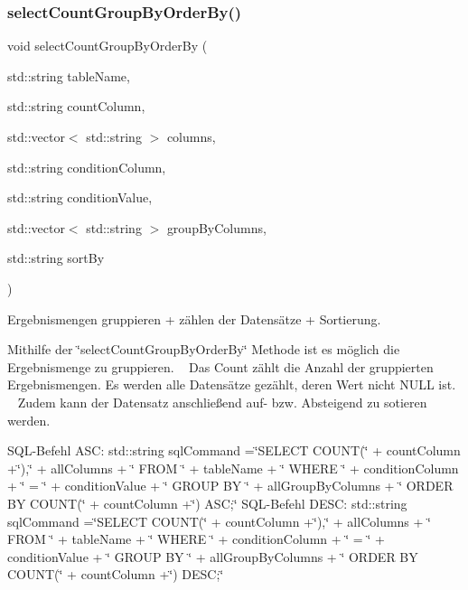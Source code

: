\subsubsection{select\+Count\+Group\+By\+Order\+By()}
{\footnotesize\ttfamily void select\+Count\+Group\+By\+Order\+By (\begin{DoxyParamCaption}\item[{std\+::string}]{table\+Name,  }\item[{std\+::string}]{count\+Column,  }\item[{std\+::vector$<$ std\+::string $>$}]{columns,  }\item[{std\+::string}]{condition\+Column,  }\item[{std\+::string}]{condition\+Value,  }\item[{std\+::vector$<$ std\+::string $>$}]{group\+By\+Columns,  }\item[{std\+::string}]{sort\+By }\end{DoxyParamCaption})}



Ergebnismengen gruppieren + zählen der Datensätze + Sortierung. 

Mithilfe der \char`\"{}select\+Count\+Group\+By\+Order\+By\char`\"{} Methode ist es möglich die Ergebnismenge zu gruppieren. ~\newline
 Das Count zählt die Anzahl der gruppierten Ergebnismengen. Es werden alle Datensätze gezählt, deren Wert nicht N\+U\+LL ist. ~\newline
 Zudem kann der Datensatz anschließend auf-\/ bzw. Absteigend zu sotieren werden. ~\newline


S\+Q\+L-\/\+Befehl A\+SC\+: std\+::string sql\+Command =\char`\"{}\+S\+E\+L\+E\+C\+T C\+O\+U\+N\+T(\char`\"{} + count\+Column +\char`\"{}),\char`\"{} + all\+Columns + \char`\"{} F\+R\+O\+M \char`\"{} + table\+Name + \char`\"{} W\+H\+E\+R\+E \char`\"{} + condition\+Column + \char`\"{} = \textquotesingle{}\char`\"{} + condition\+Value + \char`\"{}\textquotesingle{} G\+R\+O\+U\+P B\+Y \char`\"{} + all\+Group\+By\+Columns + \char`\"{} O\+R\+D\+E\+R B\+Y C\+O\+U\+N\+T(\char`\"{} + count\+Column +\char`\"{}) A\+S\+C;\char`\"{} S\+Q\+L-\/\+Befehl D\+E\+SC\+: std\+::string sql\+Command =\char`\"{}\+S\+E\+L\+E\+C\+T C\+O\+U\+N\+T(\char`\"{} + count\+Column +\char`\"{}),\char`\"{} + all\+Columns + \char`\"{} F\+R\+O\+M \char`\"{} + table\+Name + \char`\"{} W\+H\+E\+R\+E \char`\"{} + condition\+Column + \char`\"{} = \textquotesingle{}\char`\"{} + condition\+Value + \char`\"{}\textquotesingle{} G\+R\+O\+U\+P B\+Y \char`\"{} + all\+Group\+By\+Columns + \char`\"{} O\+R\+D\+E\+R B\+Y C\+O\+U\+N\+T(\char`\"{} + count\+Column +\char`\"{}) D\+E\+S\+C;\char`\"{}


